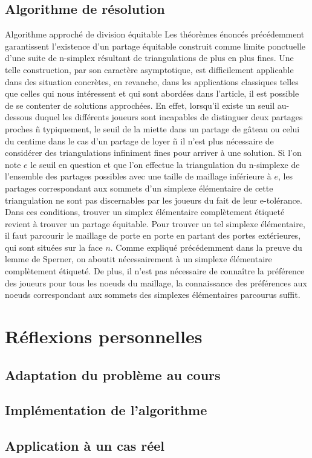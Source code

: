 \documentclass[12pt,twoside,a4paper]{article}
\begin{document}
\subsection{Algorithme de r\'esolution}

Algorithme approch\'e de division \'equitable 
Les th\'eor\`emes \'enonc\'es pr\'ec\'edemment garantissent l'existence d'un partage \'equitable construit comme limite ponctuelle d'une suite de n-simplex r\'esultant de triangulations de plus en plus fines. Une telle construction, par son caract\`ere asymptotique, est difficilement applicable dans des situation concr\`etes, en revanche, dans les applications classiques telles que celles qui nous int\'eressent et qui sont abord\'ees dans l'article, il est possible de se contenter de solutions approch\'ees. En effet, lorsqu'il existe un seuil au-dessous duquel les diff\'erents joueurs sont incapables de distinguer deux partages proches ñ typiquement, le seuil de la miette dans un partage de g\^ateau ou celui du centime dans le cas d'un partage de loyer ñ il n'est plus n\'ecessaire de consid\'erer des triangulations infiniment fines pour arriver \`a une solution.
Si l'on note $e$ le seuil en question et que l'on effectue la triangulation du n-simplexe de l'ensemble des partages possibles avec une taille de maillage inf\'erieure \`a $e$, les partages correspondant aux sommets d'un simplexe \'el\'ementaire de cette triangulation ne sont pas discernables par les joueurs du fait de leur e-tol\'erance. Dans ces conditions, trouver un simplex \'el\'ementaire compl\`etement \'etiquet\'e revient \`a trouver un partage \'equitable.
Pour trouver un tel simplexe \'el\'ementaire, il faut parcourir le maillage de porte en porte en partant des portes ext\'erieures, qui sont situ\'ees sur la face $n$. Comme expliqu\'e pr\'ec\'edemment dans la preuve du lemme de Sperner, on aboutit n\'ecessairement \`a un simplexe \'el\'ementaire compl\`etement \'etiquet\'e. De plus, il n'est pas n\'ecessaire de conna\^itre la pr\'ef\'erence des joueurs pour tous les noeuds du maillage, la connaissance des pr\'ef\'erences aux noeuds correspondant aux sommets des simplexes \'el\'ementaires parcourus suffit.

\section{R\'eflexions personnelles}

\subsection{Adaptation du probl\`eme au cours}

\subsection{Impl\'ementation de l'algorithme}

\subsection{Application \`a un cas r\'eel}
\end{document}

